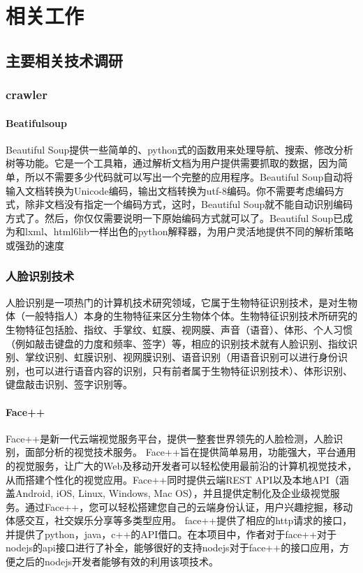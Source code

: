 
\chapter{相关工作}
\section{主要相关技术调研}
\subsection{crawler}
\subsubsection{Beatifulsoup}
Beautiful Soup提供一些简单的、python式的函数用来处理导航、搜索、修改分析树等功能。它是一个工具箱，通过解析文档为用户提供需要抓取的数据，因为简单，所以不需要多少代码就可以写出一个完整的应用程序。Beautiful Soup自动将输入文档转换为Unicode编码，输出文档转换为utf-8编码。你不需要考虑编码方式，除非文档没有指定一个编码方式，这时，Beautiful Soup就不能自动识别编码方式了。然后，你仅仅需要说明一下原始编码方式就可以了。Beautiful Soup已成为和lxml、html6lib一样出色的python解释器，为用户灵活地提供不同的解析策略或强劲的速度
\subsection{人脸识别技术}
人脸识别是一项热门的计算机技术研究领域，它属于生物特征识别技术，是对生物体（一般特指人）本身的生物特征来区分生物体个体。生物特征识别技术所研究的生物特征包括脸、指纹、手掌纹、虹膜、视网膜、声音（语音）、体形、个人习惯（例如敲击键盘的力度和频率、签字）等，相应的识别技术就有人脸识别、指纹识别、掌纹识别、虹膜识别、视网膜识别、语音识别（用语音识别可以进行身份识别，也可以进行语音内容的识别，只有前者属于生物特征识别技术）、体形识别、键盘敲击识别、签字识别等。
\subsubsection{Face++}
Face++是新一代云端视觉服务平台，提供一整套世界领先的人脸检测，人脸识别，面部分析的视觉技术服务。
Face++旨在提供简单易用，功能强大，平台通用的视觉服务，让广大的Web及移动开发者可以轻松使用最前沿的计算机视觉技术，从而搭建个性化的视觉应用。Face++同时提供云端REST API以及本地API（涵盖Android, iOS, Linux, Windows, Mac OS），并且提供定制化及企业级视觉服务。通过Face++，您可以轻松搭建您自己的云端身份认证，用户兴趣挖掘，移动体感交互，社交娱乐分享等多类型应用。
face++提供了相应的http请求的接口，并提供了python，java，c++的API借口。在本项目中，作者对于face++对于nodejs的api接口进行了补全，能够很好的支持nodejs对于face++的接口应用，方便之后的nodejs开发者能够有效的利用该项技术。

